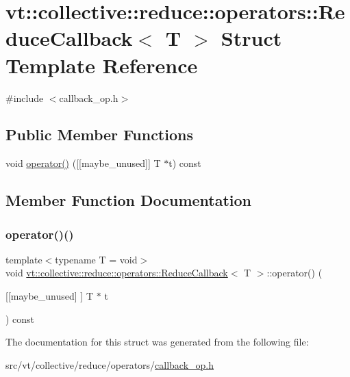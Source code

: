 \hypertarget{structvt_1_1collective_1_1reduce_1_1operators_1_1_reduce_callback}{}\section{vt\+:\+:collective\+:\+:reduce\+:\+:operators\+:\+:Reduce\+Callback$<$ T $>$ Struct Template Reference}
\label{structvt_1_1collective_1_1reduce_1_1operators_1_1_reduce_callback}


{\ttfamily \#include $<$callback\+\_\+op.\+h$>$}

\subsection*{Public Member Functions}
\begin{DoxyCompactItemize}
\item 
void \hyperlink{structvt_1_1collective_1_1reduce_1_1operators_1_1_reduce_callback_ae68089f9bc81c50ce19cf298f02ad3cd}{operator()} (\mbox{[}\mbox{[}maybe\+\_\+unused\mbox{]}\mbox{]} T $\ast$t) const
\end{DoxyCompactItemize}


\subsection{Member Function Documentation}
\mbox{\label{structvt_1_1collective_1_1reduce_1_1operators_1_1_reduce_callback_ae68089f9bc81c50ce19cf298f02ad3cd}} 
\subsubsection{\texorpdfstring{operator()()}{operator()()}}
{\footnotesize\ttfamily template$<$typename T  = void$>$ \\
void \hyperlink{structvt_1_1collective_1_1reduce_1_1operators_1_1_reduce_callback}{vt\+::collective\+::reduce\+::operators\+::\+Reduce\+Callback}$<$ T $>$\+::operator() (\begin{DoxyParamCaption}\item[{\mbox{[}\mbox{[}maybe\+\_\+unused\mbox{]} \mbox{]} T $\ast$}]{t }\end{DoxyParamCaption}) const\hspace{0.3cm}{\ttfamily [inline]}}



The documentation for this struct was generated from the following file\+:\begin{DoxyCompactItemize}
\item 
src/vt/collective/reduce/operators/\hyperlink{callback__op_8h}{callback\+\_\+op.\+h}\end{DoxyCompactItemize}

